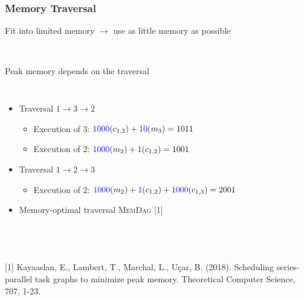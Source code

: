 \documentclass[xcolor=svgnames,titlepage,english,presentation]{beamer}
\begin{document}
\begin{frame}[t]
    \frametitle{Memory Traversal}

    Fit into limited memory $\rightarrow$ use as little memory as possible

    ~~~~~~~~~~~~~~

  Peak memory depends on the traversal 

    
 \begin{columns}
     \begin{itemize}            
               \item Traversal $1 \rightarrow 3 \rightarrow 2$ 
             \begin{itemize}
                \item Execution of 3: $\textcolor{blue}{1000} (c_{1,2})+ \textcolor{blue}{10} (m_3) = 1011$
                \item Execution of 2: $\textcolor{blue}{1000} (m_2) + \textcolor{blue}{1} (c_{1,2}) = 1001$
            \end{itemize}
            \item Traversal $1 \rightarrow 2 \rightarrow 3$ 
            \begin{itemize}
                \item Execution of 2: $\textcolor{blue}{1000} (m_2)+ \textcolor{blue}{1} (c_{1,2}) + \textcolor{blue}{1000} (c_{1,3}) = 2001$
            \end{itemize}         

            \item Memory-optimal traversal \textsc{MemDag} [1]
                       
        \end{itemize}

    \end{columns}  

~~~~~~~~~~~~~

 \footnotesize {[1] Kayaaslan, E., Lambert, T., Marchal, L., U{\c{c}}ar, B. (2018). Scheduling series-parallel task graphs to minimize peak memory. Theoretical Computer Science, 707, 1-23.}

 ~~~~~~
\end{frame}
\end{document}
